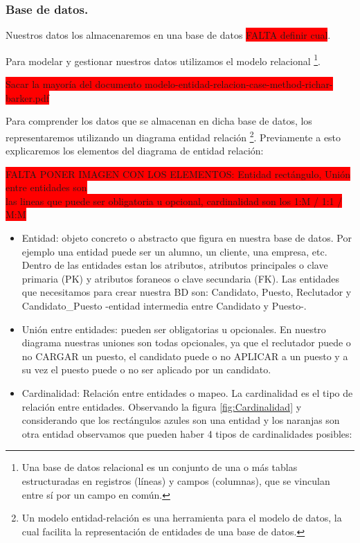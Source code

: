 \documentclass[12pt,a4paper]{article}
\begin{document}
\begin{sloppypar}
\cleardoublepage

\subsubsection{Base de datos.}

Nuestros datos los almacenaremos en una base de datos \colorbox{red}{FALTA definir cual}. 

Para modelar y gestionar nuestros datos utilizamos el modelo relacional \footnote{Una base de datos relacional es un conjunto de una o más tablas estructuradas en registros (líneas) y campos (columnas), que se vinculan entre sí por un campo en común.}.

\colorbox{red}{Sacar la mayoría del documento modelo-entidad-relacion-case-method-richar-barker.pdf} 

Para comprender los datos que se almacenan en dicha base de datos, los representaremos utilizando un diagrama entidad relación \footnote{Un modelo entidad-relación es una herramienta para el modelo de datos, la cual facilita la representación de entidades de una base de datos.}.
Previamente a esto explicaremos los elementos del diagrama de entidad relación: 

\colorbox{red}{FALTA PONER IMAGEN CON LOS ELEMENTOS: Entidad rectángulo, Unión entre entidades son} \\ \colorbox{red}{las lineas que puede ser obligatoria u opcional, cardinalidad son los 1:M / 1:1 / M:M}

\begin{itemize}
\item Entidad: objeto concreto o abstracto que figura en nuestra base de datos. Por ejemplo una entidad puede ser un alumno, un cliente, una empresa, etc. Dentro de las entidades estan los atributos, atributos principales o clave primaria (PK) y atributos foraneos o clave secundaria (FK).  Las entidades que necesitamos para crear nuestra BD son: Candidato, Puesto, Reclutador y Candidato\_Puesto -entidad intermedia entre Candidato y Puesto-.
\item Unión entre entidades: pueden ser obligatorias u opcionales. En nuestro diagrama nuestras uniones son todas opcionales, ya que el reclutador puede o no CARGAR un puesto, el candidato puede o no APLICAR a un puesto y a su vez el puesto puede o no ser aplicado por un candidato. 
\item Cardinalidad: Relación entre entidades o mapeo. La cardinalidad es el tipo de relación entre entidades. Observando la figura \ref{fig:Cardinalidad} y considerando que los rectángulos azules son una entidad y los naranjas son otra entidad observamos que pueden haber 4 tipos de cardinalidades posibles:


\end{itemize}
\end{sloppypar}
\end{document}
